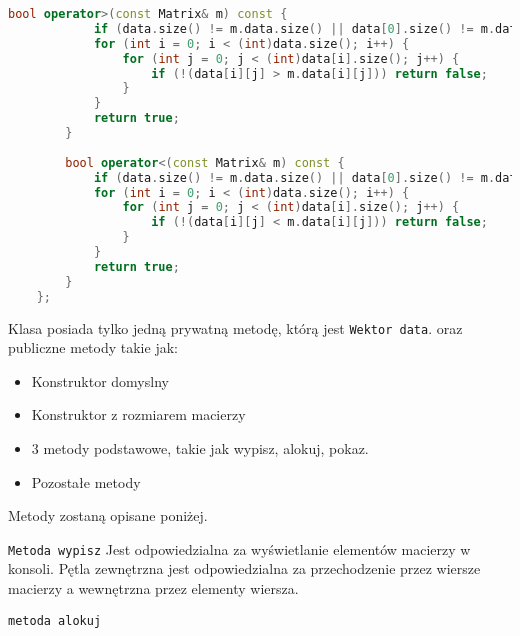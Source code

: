 \begin{lstlisting}[caption=Klasa \texttt{MergeSorter}, label={lst:matrixclass}, language=C++]
		bool operator>(const Matrix& m) const {
			if (data.size() != m.data.size() || data[0].size() != m.data[0].size()) return false;
			for (int i = 0; i < (int)data.size(); i++) {
				for (int j = 0; j < (int)data[i].size(); j++) {
					if (!(data[i][j] > m.data[i][j])) return false;
				}
			}
			return true;
		}
		
		bool operator<(const Matrix& m) const {
			if (data.size() != m.data.size() || data[0].size() != m.data[0].size()) return false;
			for (int i = 0; i < (int)data.size(); i++) {
				for (int j = 0; j < (int)data[i].size(); j++) {
					if (!(data[i][j] < m.data[i][j])) return false;
				}
			}
			return true;
		}
	};
\end{lstlisting}
  
Klasa posiada tylko jedną prywatną metodę, którą jest \texttt{Wektor data}. oraz publiczne metody takie jak:
\begin{itemize}
	\item Konstruktor domyslny
	\item Konstruktor z rozmiarem macierzy
	\item 3 metody podstawowe, takie jak wypisz, alokuj, pokaz.
	\item Pozostałe metody
\end{itemize}
Metody zostaną opisane poniżej.

\texttt{Metoda wypisz}
Jest odpowiedzialna za wyświetlanie elementów macierzy w konsoli. Pętla zewnętrzna jest odpowiedzialna za przechodzenie przez wiersze macierzy a wewnętrzna przez elementy wiersza.

\texttt{metoda alokuj}